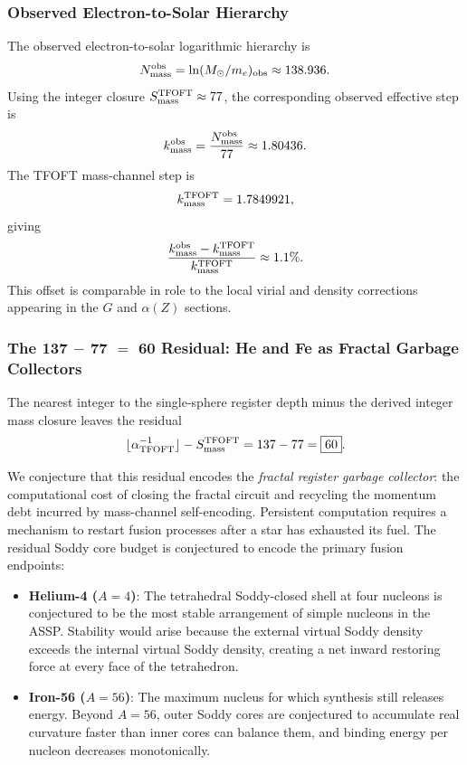 \documentclass[11pt,a4paper]{article}
\begin{document}
\subsubsection{Observed Electron-to-Solar Hierarchy}
\label{sec:mass_observed_crosscheck}

The observed electron-to-solar logarithmic hierarchy is
\[
N_{\rm mass}^{\rm obs}
=
\ln(M_\odot/m_e)_{\rm obs}
\approx
138.936.
\]
Using the integer closure \(S_{\rm mass}^{\rm TFOFT}\approx77\), the
corresponding observed effective step is
\[
k_{\rm mass}^{\rm obs}
=
\frac{N_{\rm mass}^{\rm obs}}{77}
\approx
1.80436.
\]
The TFOFT mass-channel step is
\[
k_{\rm mass}^{\rm TFOFT}=1.7849921,
\]
giving
\[
\frac{k_{\rm mass}^{\rm obs}-k_{\rm mass}^{\rm TFOFT}}
{k_{\rm mass}^{\rm TFOFT}}
\approx
1.1\%.
\]
This offset is comparable in role to the local virial and density corrections
appearing in the \(G\) and \(\alpha(Z)\) sections.


\subsubsection{The 137 $-$ 77 $=$ 60 Residual: He and Fe as Fractal Garbage Collectors}
\label{sec:he_fe_garbage_collector}

The nearest integer to the single-sphere register depth minus the derived
integer mass closure leaves the residual
\[
\lfloor\alpha_{\rm TFOFT}^{-1}\rfloor
-
S_{\rm mass}^{\rm TFOFT}
=
137-77
=
\boxed{60}.
\]

We conjecture that this residual encodes the \emph{fractal register garbage
collector}: the computational cost of closing the fractal circuit and
recycling the momentum debt incurred by mass-channel self-encoding. Persistent
computation requires a mechanism to restart fusion processes after a star has
exhausted its fuel. The residual Soddy core budget is conjectured to encode
the primary fusion endpoints:

\begin{itemize}
  \item \textbf{Helium-4 (\(A=4\))}: The tetrahedral Soddy-closed shell at
  four nucleons is conjectured to be the most stable arrangement of simple
  nucleons in the ASSP. Stability would arise because the external virtual
  Soddy density exceeds the internal virtual Soddy density, creating a net
  inward restoring force at every face of the tetrahedron.

  \item \textbf{Iron-56 (\(A=56\))}: The maximum nucleus for which synthesis
  still releases energy. Beyond \(A=56\), outer Soddy cores are conjectured
  to accumulate real curvature faster than inner cores can balance them, and
  binding energy per nucleon decreases monotonically.
\end{itemize}
\end{document}
